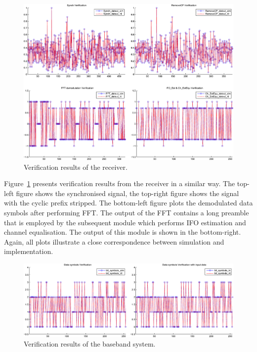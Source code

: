 \begin{figure}
	\includegraphics[width=1\columnwidth]{Figures/Rx_Verification.pdf}
	\caption{Verification results of the receiver.}
	\label{fig:RX_Ver}
\end{figure}

Figure~\ref{fig:RX_Ver} presents verification results from the receiver in a similar way. The top-left figure shows the synchronised signal, the top-right figure shows the signal with the cyclic prefix stripped. The bottom-left figure plots the demodulated data symbols after performing FFT. The output of the FFT contains a long preamble that is employed by the subsequent module which performs IFO estimation and channel equalisation. The output of this module is shown in the bottom-right. Again, all plots illustrate a close correspondence between simulation and implementation.

\begin{figure}
	\includegraphics[width=1\columnwidth]{Figures/Sys_Verification.pdf}
	\caption{Verification results of the baseband system.}
	\label{fig:Sys_Ver}
\end{figure}

